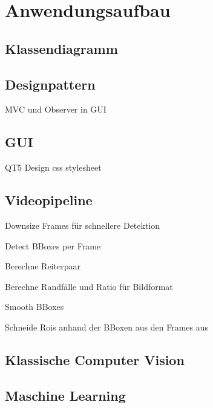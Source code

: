 \chapter{Anwendungsaufbau}
\label{ch:anwendungsaufbau}

\section{Klassendiagramm}
\section{Designpattern}
MVC und Observer in GUI
\section{GUI}
QT5
Design css stylesheet
\section{Videopipeline}
Downsize Frames für schnellere Detektion

Detect BBoxes per Frame

Berechne Reiterpaar

Berechne Randfälle und Ratio für Bildformat

Smooth BBoxes

Schneide Rois anhand der BBoxen aus den Frames aus



\section{Klassische Computer Vision}
\section{Maschine Learning}



